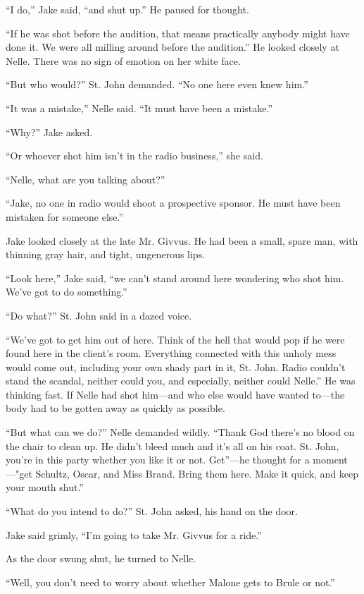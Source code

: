 \documentclass{novel}
\begin{document}
“I do,” Jake said, “and shut up.” He paused for thought.

“If he was shot before the audition, that means practically anybody might have done it. We were all milling around before the audition.” He looked closely at Nelle. There was no sign of emotion on her white face.

“But who would?” St. John demanded. “No one here even knew him.”

“It was a mistake,” Nelle said. “It must have been a mistake.”

“Why?” Jake asked.

“Or whoever shot him isn’t in the radio business,” she said.

“Nelle, what are you talking about?”

“Jake, no one in radio would shoot a prospective sponsor. He must have been mistaken for someone else.”

Jake looked closely at the late Mr. Givvus. He had been a small, spare man, with thinning gray hair, and tight, ungenerous lips.

“Look here,” Jake said, “we can’t stand around here wondering who shot him. We’ve got to do something.”

“Do what?” St. John said in a dazed voice.

“We’ve got to get him out of here. Think of the hell that would pop if he were found here in the client’s room. Everything connected with this unholy mess would come out, including your own shady part in it, St. John. Radio couldn’t stand the scandal, neither could you, and especially, neither could Nelle.” He was thinking fast. If Nelle had shot him—and who else would have wanted to—the body had to be gotten away as quickly as possible.

“But what can we do?” Nelle demanded wildly. “Thank God there’s no blood on the chair to clean up. He didn’t bleed much and it’s all on his coat. St. John, you’re in this party whether you like it or not. Get”—he thought for a moment—"get Schultz, Oscar, and Miss Brand. Bring them here. Make it quick, and keep your mouth shut.”

“What do you intend to do?” St. John asked, his hand on the door.

Jake said grimly, “I’m going to take Mr. Givvus for a ride.”

As the door swung shut, he turned to Nelle.

“Well, you don’t need to worry about whether Malone gets to Brule or not.”
\end{document}

